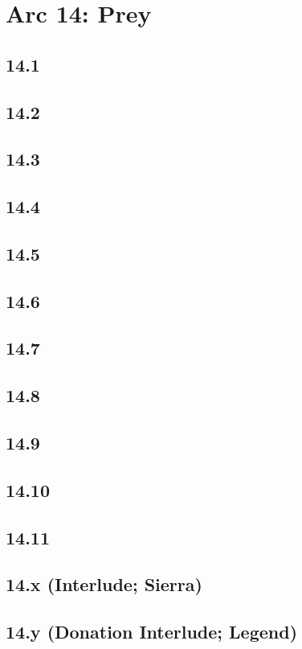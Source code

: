 \part{Arc 14: Prey}
 \chapter{14.1}
 \chapter{14.2}
 \chapter{14.3}
 \chapter{14.4}
 \chapter{14.5}
 \chapter{14.6}
 \chapter{14.7}
 \chapter{14.8}
 \chapter{14.9}
 \chapter{14.10}
 \chapter{14.11}
 \chapter{14.x (Interlude; Sierra)}
 \chapter{14.y (Donation Interlude; Legend)}














